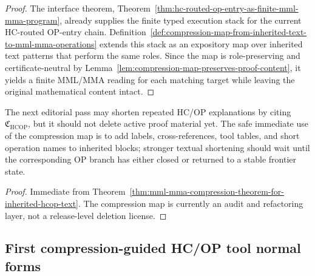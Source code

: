 \begin{proof}
The interface theorem, Theorem~\ref{thm:hc-routed-op-entry-as-finite-mml-mma-program}, already supplies the finite typed execution stack for the current HC-routed OP-entry chain. Definition~\ref{def:compression-map-from-inherited-text-to-mml-mma-operations} extends this stack as an expository map over inherited text patterns that perform the same roles. Since the map is role-preserving and certificate-neutral by Lemma~\ref{lem:compression-map-preserves-proof-content}, it yields a finite MML/MMA reading for each matching target while leaving the original mathematical content intact.
\end{proof}

\begin{corollary}
\label{cor:v3340-r08-working-rule}
The next editorial pass may shorten repeated HC/OP explanations by citing \(\mathfrak C_{\mathrm{HCOP}}\), but it should not delete active proof material yet. The safe immediate use of the compression map is to add labels, cross-references, tool tables, and short operation names to inherited blocks; stronger textual shortening should wait until the corresponding OP branch has either closed or returned to a stable frontier state.
\end{corollary}

\begin{proof}
Immediate from Theorem~\ref{thm:mml-mma-compression-theorem-for-inherited-hcop-text}. The compression map is currently an audit and refactoring layer, not a release-level deletion license.
\end{proof}



\subsection{First compression-guided HC/OP tool normal forms}
\label{subsec:first-compression-guided-hcop-tool-normal-forms}

